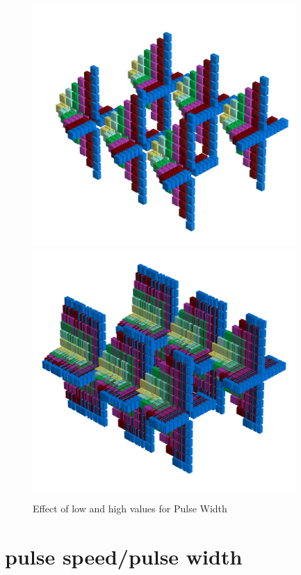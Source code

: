 \begin{figure}[H]
    \centering
    \begin{adjustbox}{width=15cm,center}
      \includegraphics[width=10cm]{src/pulsewidth/pattern0-45.png}%
      \includegraphics[width=10cm]{src/pulsewidth/pattern1-45.png}%
    \end{adjustbox}
    \caption{Effect of low and high values for Pulse Width}
\end{figure}
\clearpage
\section*{pulse speed/pulse width}
\label{sec:pulse_speed}
\lstset{style=6502Style}
\lstset{ 
   aboveskip=5pt,
   belowskip=0pt,
}

